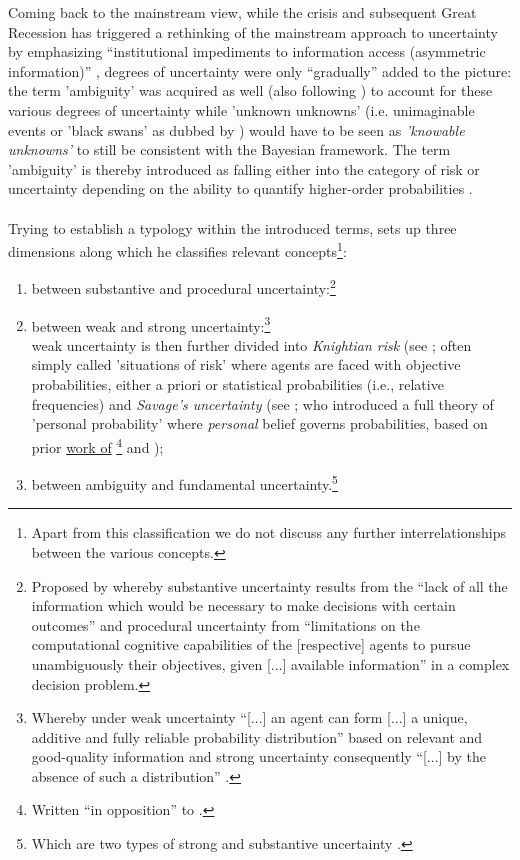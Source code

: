 \documentclass[a4paper,11pt,listof=nochaptergap,oneside,pointednumbers,bibtotoc,bigheadings,liststotoc,hidelinks]{scrbook}
\theoremstyle{mysatz}
\theoremstyle{mydefinition}
\theoremstyle{mytheorem}
\theoremstyle{mybemerkung}
\begin{document}
Coming back to the mainstream view, while the crisis and subsequent Great Recession has triggered a rethinking of the mainstream approach to uncertainty by emphasizing ``institutional impediments to information access (asymmetric information)'' \citep[p. 8]{dow:16}, degrees of uncertainty were only ``gradually'' \citep[p. 11]{dow:16} added to the picture: the term 'ambiguity' was acquired as well (also following \citealp[p. 330]{camererandweber:92}) to account for these various degrees of uncertainty while 'unknown unknowns' (i.e. unimaginable events or 'black swans' as dubbed by \citealp{taleb:08}) would have to be seen as \textit{'knowable unknowns'} to still be consistent with the Bayesian framework. The term 'ambiguity' is thereby introduced as falling either into the category of risk or uncertainty depending on the ability to quantify higher-order probabilities \citep{dow:16}.\\
\\
Trying to establish a typology within the introduced terms, \citet{dequech:14}  sets up three dimensions along which he classifies relevant concepts\footnote{Apart from this classification we do not discuss any further interrelationships between the various concepts.}: 
\begin{enumerate}
	\item between substantive and procedural uncertainty:\footnote{Proposed by \citet[p. 145]{dosiandegidi:91} whereby substantive uncertainty results from the ``lack of all the information which would be necessary to make decisions with certain outcomes'' and procedural uncertainty from ``limitations on the computational cognitive capabilities of the [respective] agents to pursue unambiguously their objectives, given [...] available information'' in a complex decision problem. }
	\item between weak and strong uncertainty:\footnote{Whereby under weak uncertainty ``[...] an agent can form [...] a unique, additive and fully reliable probability distribution'' based on relevant and good-quality information and strong uncertainty consequently ``[...] by the absence of such a distribution'' \citep[p. 622/623]{dequech:14}.} \\
	weak uncertainty is then further divided into \textit{Knightian risk} (see \citet{knight:21}; often simply called 'situations of risk' where agents are faced with objective probabilities, either a priori or statistical probabilities (i.e., relative frequencies) and \textit{Savage's uncertainty} (see \citet{savage:54}; who introduced a full theory of 'personal probability' where \textit{personal} belief governs probabilities, based on prior \href{https://archive.org/stream/in.ernet.dli.2015.223806/2015.223806.The-Foundations#page/n289/mode/2up}{work of} \href{http://www.brunodefinetti.it/Link/Subjective%20Expected%20Utility%20-%20Intro.htm}{\citet{ramsey:26}\footnote{Written ``in opposition'' to \citet{keynes:21}.} and \citet{finetti:37}});
	\item between ambiguity and fundamental uncertainty.\footnote{Which are two types of strong and substantive uncertainty \citep{dequesh:00}.}
\end{enumerate}
\vspace{1cm}
\end{document}
